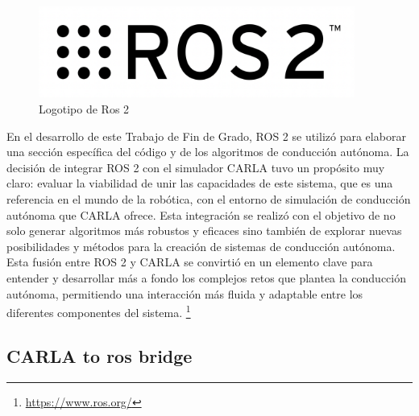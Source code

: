 \bigskip
\begin{figure} [H]
	\begin{center}
	\includegraphics[height=3cm]{imagenes/cap3/ros2_logo.png}
	\end{center}
	\caption[logotipo de Ros 2]{Logotipo de Ros 2}
	\label{fig:Ros2_logos}
\end{figure}
\bigskip

En el desarrollo de este Trabajo de Fin de Grado, ROS 2 se utilizó para elaborar una sección específica del código y de los algoritmos de conducción autónoma. La decisión de integrar ROS 2 con el simulador CARLA tuvo un propósito muy claro: evaluar la viabilidad de unir las capacidades de este sistema, que es una referencia en el mundo de la robótica, con el entorno de simulación de conducción autónoma que CARLA ofrece. Esta integración se realizó con el objetivo de no solo generar algoritmos más robustos y eficaces sino también de explorar nuevas posibilidades y métodos para la creación de sistemas de conducción autónoma. Esta fusión entre ROS 2 y CARLA se convirtió en un elemento clave para entender y desarrollar más a fondo los complejos retos que plantea la conducción autónoma, permitiendo una interacción más fluida y adaptable entre los diferentes componentes del sistema. \footnote{\url{https://www.ros.org/}}

\bigskip 

\subsection{CARLA to ros bridge}
\label{subsec:CARLA to ros bridge}

